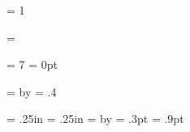 {{%
%
\newcount\truepage \truepage = 1
\def\addtruepage{%
   \vbox to 0pt{\vskip -\headmargin\vskip -2pc
      \moveleft\cropmargin\hbox to \totalwidth{%
         \twelvebf
         \quad\TeX\ 急就帖\hss
         N\raise 3.3pt\hbox{o} \the\truepage\quad}%
      \vss}%
}


%
%
\newtoks\shortmark \shortmark = {}
\newif\ifchangemark

\def\markinfo#1{%
   \ifchangemark
      \mark{\the\shortmark}\changemarkfalse
   \else
      \mark{#1}%
   \fi
}

\def\changemark#1{\shortmark = {#1}\changemarktrue}


%
\newcount\numtabs  \numtabs = 7
\newdimen\edgetabjump  \edgetabjump = 0pt
\def\nextedgetab{%
   \advance\edgetabjump by \edgetabdepth
}

\def\settabdepth#1{%
   \edgetabdepth = #1
   \setbox\tabbox = \vbox to \edgetabdepth{%
      \leaders
      \vbox{\vskip \edgespacing
         \hrule width\edgetabwidth height0pt depth\edgethick}%
      \vfil}
}

\newskip\bigtab \newskip\smalltab
\newskip\edgetabdepth
\newbox\tabbox

\bigtab = \totalheight    \divide\bigtab by \numtabs
\smalltab = .4\bigtab %

\newdimen\edgetabin     \edgetabin = .25in
\newdimen\edgetabbleed  \edgetabbleed = .25in
\newdimen\edgetabwidth
   \edgetabwidth = \edgetabin
   \advance \edgetabwidth by \edgetabbleed
\newdimen\edgethick   \edgethick = .3pt %
\newdimen\edgespacing \edgespacing = .9pt %


\def\edgetabs{\vbox to 0pt{%
   \vskip-\headmargin
   \vskip\edgetabjump
   \hbox{%
      \hskip \hsize
      \hskip\outsidemargin
      \hskip-\edgetabin
      \copy\tabbox
      }%
   \vss
}}


%
\def\pagecontents{%
   \unvbox255   %
   \ifvoid\footins\else   %
      \vskip\skip\footins
      \footnoterule
      \unvbox\footins
   \fi
}


}}
